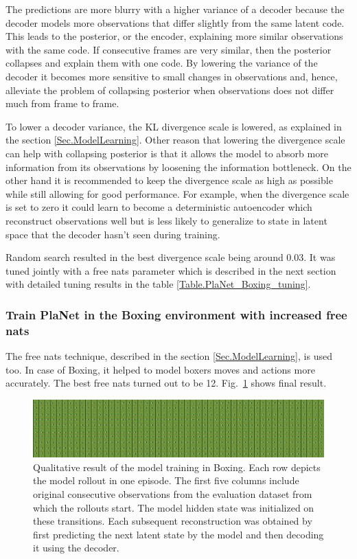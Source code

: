 The predictions are more blurry with a higher variance of a decoder because the decoder models more observations that differ slightly from the same latent code. This leads to the posterior, or the encoder, explaining more similar observations with the same code. If consecutive frames are very similar, then the posterior collapses and explain them with one code. By lowering the variance of the decoder it becomes more sensitive to small changes in observations and, hence, alleviate the problem of collapsing posterior when observations does not differ much from frame to frame.

To lower a decoder variance, the KL divergence scale is lowered, as explained in the section \ref{Sec.ModelLearning}. Other reason that lowering the divergence scale can help with collapsing posterior is that it allows the model to absorb more information from its observations by loosening the information bottleneck. On the other hand it is recommended to keep the divergence scale as high as possible while still allowing for good performance. For example, when the divergence scale is set to zero it could learn to become a deterministic autoencoder which reconstruct observations well but is less likely to generalize to state in latent space that the decoder hasn't seen during training.

Random search resulted in the best divergence scale being around 0.03. It was tuned jointly with a free nats parameter which is described in the next section with detailed tuning results in the table \ref{Table.PlaNet_Boxing_tuning}.

\subsubsection{Train PlaNet in the Boxing environment with increased free nats}

The free nats technique, described in the section \ref{Sec.ModelLearning}, is used too. In case of Boxing, it helped to model boxers moves and actions more accurately. The best free nats turned out to be 12. Fig.~\ref{Fig.PlaNet_Boxing_lower_divergence_scale} shows final result.

\begin{figure}[H]
\includegraphics[width=1\textwidth,keepaspectratio]{figures/PlaNet/Boxing_memory_sharp.png}
\caption[Qualitative result of the PlaNet model training with a lower divergence scale in Boxing]{Qualitative result of the model training in Boxing. Each row depicts the model rollout in one episode. The first five columns include original consecutive observations from the evaluation dataset from which the rollouts start. The model hidden state was initialized on these transitions. Each subsequent reconstruction was obtained by first predicting the next latent state by the model and then decoding it using the decoder.}
\label{Fig.PlaNet_Boxing_lower_divergence_scale}
\end{figure}

